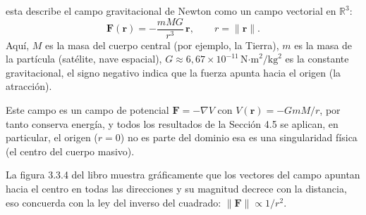 \begin{enumerate}
    \begin{respuesta}[title=P15.12]
    esta describe el campo gravitacional de Newton como un
campo vectorial en $\mathbb{R}^3$:
\[
  \mathbf{F}(\mathbf{r}) = -\frac{mMG}{r^3}\,\mathbf{r},
  \qquad r = \|\mathbf{r}\|.
\]
Aquí, $M$ es la masa del cuerpo central (por ejemplo, la Tierra), $m$ es la masa de la partícula (satélite, nave espacial),
$G\approx 6{,}67\times10^{-11}\,\text{N·m}^2/\text{kg}^2$ es la constante gravitacional, el signo negativo indica que la fuerza apunta hacia el origen (la atracción).


Este campo es un campo de potencial $\mathbf{F}=-\nabla V$ con
$V(\mathbf{r})=-GmM/r$, por tanto conserva energía, y todos los resultados de
la Sección 4.5 se aplican, en particular, el origen ($r=0$) no es parte del
dominio esa es una singularidad física (el centro del cuerpo masivo).

\medskip
La figura 3.3.4 del libro muestra gráficamente que los vectores del campo
apuntan hacia el centro en todas las direcciones y su magnitud decrece con
la distancia, eso concuerda con la ley del inverso del cuadrado:
$\|\mathbf{F}\|\propto 1/r^2$.
        \vspace{5cm}
    \end{respuesta}

\end{enumerate}

\newpage
